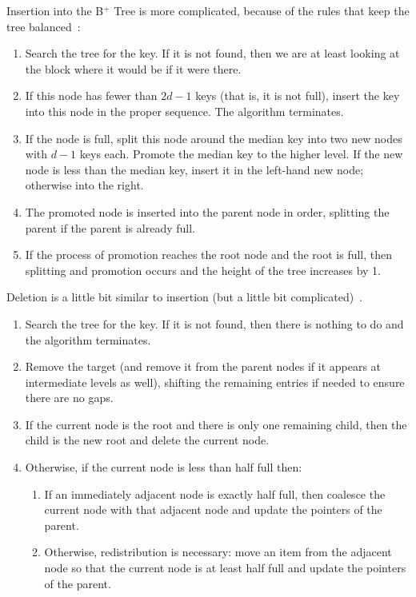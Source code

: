Insertion into the B$^{+}$ Tree is more complicated, because of the rules that keep the tree balanced~\cite{osi}:

\begin{enumerate}
	\item Search the tree for the key. If it is not found, then we are at least looking at the block where it would be if it were there.
	\item If this node has fewer than $2d-1$ keys (that is, it is not full), insert the key into this node in the proper sequence. The algorithm terminates.
	\item If the node is full, split this node around the median key into two new nodes with $d-1$ keys each. Promote the median key to the higher level. If the new node is less than the median key, insert it in the left-hand new node; otherwise into the right.
	\item The promoted node is inserted into the parent node in order, splitting the parent if the parent is already full.
	\item If the process of promotion reaches the root node and the root is full, then splitting and promotion occurs and the height of the tree increases by 1.
\end{enumerate}


Deletion is a little bit similar to insertion (but a little bit complicated)~\cite{dsc}. 

\begin{enumerate}
	\item Search the tree for the key. If it is not found, then there is nothing to do and the algorithm terminates.
	\item Remove the target (and remove it from the parent nodes if it appears at intermediate levels as well), shifting the remaining entries if needed to ensure there are no gaps.
	\item If the current node is the root and there is only one remaining child, then the child is the new root and delete the current node.
	\item Otherwise, if the current node is less than half full then:
		\begin{enumerate}
			\item If an immediately adjacent node is exactly half full, then coalesce the current node with that adjacent node and update the pointers of the parent.
			\item Otherwise, redistribution is necessary: move an item from the adjacent node so that the current node is at least half full and update the pointers of the parent.
		\end{enumerate}
\end{enumerate}

